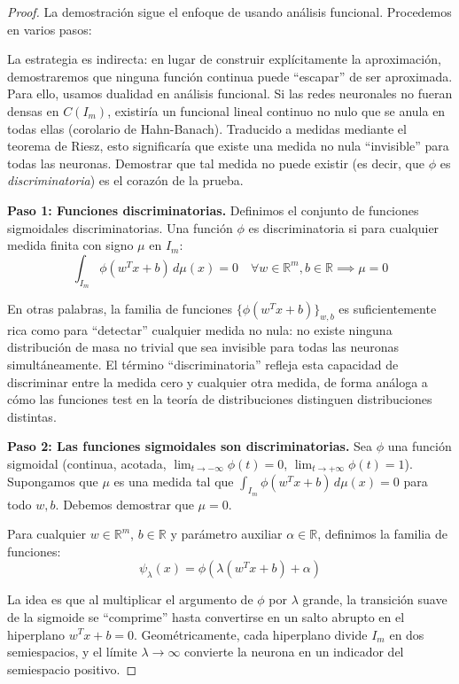 \begin{proof}
	La demostración sigue el enfoque de \citet{cybenko1989} usando análisis funcional. Procedemos en varios pasos:

	La estrategia es indirecta: en lugar de construir explícitamente la aproximación, demostraremos que ninguna función continua puede ``escapar'' de ser aproximada. Para ello, usamos dualidad en análisis funcional. Si las redes neuronales no fueran densas en \(C(I_m)\), existiría un funcional lineal continuo no nulo que se anula en todas ellas (corolario de Hahn-Banach). Traducido a medidas mediante el teorema de Riesz, esto significaría que existe una medida no nula ``invisible'' para todas las neuronas. Demostrar que tal medida no puede existir (es decir, que \(\phi\) es \textit{discriminatoria}) es el corazón de la prueba.

	\textbf{Paso 1: Funciones discriminatorias.}
	Definimos el conjunto de funciones sigmoidales discriminatorias. Una función \(\phi\) es discriminatoria si para cualquier medida finita con signo \(\mu\) en \(I_m\):
	\[
		\int_{I_m} \phi(w^T x + b) \, d\mu(x) = 0 \quad \forall w \in \mathbb{R}^m, b \in \mathbb{R} \implies \mu = 0
	\]

	En otras palabras, la familia de funciones \(\{\phi(w^T x + b)\}_{w,b}\) es suficientemente rica como para ``detectar'' cualquier medida no nula: no existe ninguna distribución de masa no trivial que sea invisible para todas las neuronas simultáneamente. El término ``discriminatoria'' refleja esta capacidad de discriminar entre la medida cero y cualquier otra medida, de forma análoga a cómo las funciones test en la teoría de distribuciones distinguen distribuciones distintas.

	\textbf{Paso 2: Las funciones sigmoidales son discriminatorias.}
	Sea \(\phi\) una función sigmoidal (continua, acotada, \(\lim_{t \to -\infty} \phi(t) = 0\), \(\lim_{t \to +\infty} \phi(t) = 1\)). Supongamos que \(\mu\) es una medida tal que \(\int_{I_m} \phi(w^T x + b) \, d\mu(x) = 0\) para todo \(w, b\). Debemos demostrar que \(\mu = 0\).

	Para cualquier \(w \in \mathbb{R}^m\), \(b \in \mathbb{R}\) y parámetro auxiliar \(\alpha \in \mathbb{R}\), definimos la familia de funciones:
	\[
		\psi_{\lambda}(x) = \phi(\lambda(w^T x + b) + \alpha)
	\]

	La idea es que al multiplicar el argumento de \(\phi\) por \(\lambda\) grande, la transición suave de la sigmoide se ``comprime'' hasta convertirse en un salto abrupto en el hiperplano \(w^T x + b = 0\). Geométricamente, cada hiperplano divide \(I_m\) en dos semiespacios, y el límite \(\lambda \to \infty\) convierte la neurona en un indicador del semiespacio positivo.


\end{proof}
